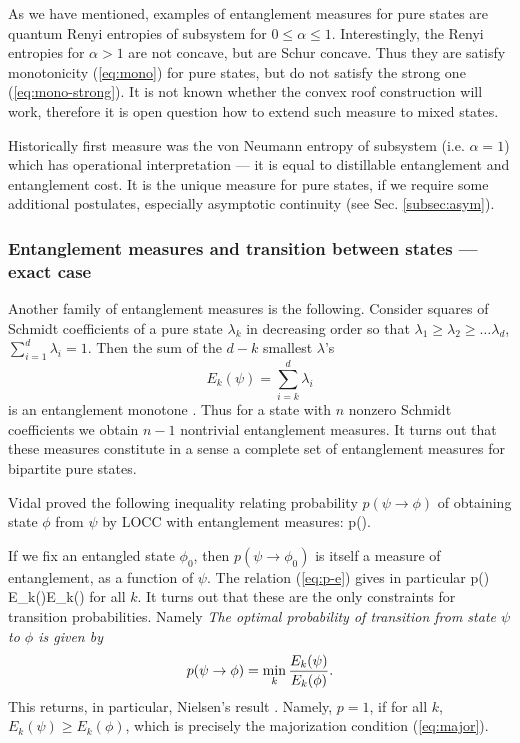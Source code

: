 \documentclass[rmp,12pt,preprint]{revtex4-2}
\begin{document}
As we have mentioned, examples of entanglement measures for pure
states are quantum Renyi entropies of subsystem for
$0\leq\alpha\leq1$. Interestingly, the Renyi entropies for
$\alpha>1$ are not concave, but are Schur concave. Thus they are
satisfy monotonicity (\ref{eq:mono}) for pure states, but do not
satisfy the strong one (\ref{eq:mono-strong}). It is not  known
whether the convex roof construction will work, therefore it is open question
 how to extend such measure to mixed states.



Historically first measure was the von Neumann entropy of subsystem
(i.e. $\alpha=1$) which has operational interpretation --- it is equal
to distillable entanglement and entanglement cost. It is the unique
measure for pure states, if we require some additional postulates,
especially asymptotic continuity (see Sec. \ref{subsec:asym}).



\subsubsection{Entanglement measures and transition between states --- exact case}
\label{subsubsec:em-tr-exact}
Another family of entanglement measures is the following. Consider
squares of Schmidt coefficients of a pure state $\lambda_k$ in
decreasing order so that $\lambda_1 \geq \lambda_2 \geq \ldots
\lambda_d$, $\sum_{i=1}^d\lambda_i=1$. Then the sum of the $d-k$
smallest $\lambda$'s \begin{equation} E_k(\psi)=\sum_{i=k}^d \lambda_i \end{equation} is an
entanglement monotone \cite{Vidal1999-ent-pure}. Thus for a state
with $n$ nonzero Schmidt coefficients we obtain $n-1$ nontrivial
entanglement measures. It turns out that these measures constitute
in a sense a complete set of entanglement measures for bipartite
pure states.

Vidal proved the following inequality relating probability $p(\psi\to \phi)$
of obtaining state $\phi$ from $\psi$ by LOCC with entanglement measures:
\be
p(\psi\to \phi).
\label{eq:p-e}
\ee

If we fix an entangled state $\phi_0$, then $p(\psi\to \phi_0)$ is
itself a measure of entanglement, as a function of $\psi$. The
relation (\ref{eq:p-e}) gives in particular \be p(\psi\to \phi) \leq
{E_k(\psi)\over E_k(\phi)} \ee for all $k$. It turns out that these
are the only constraints for transition probabilities. Namely
\cite{Vidal1999-ent-pure} {\it
The optimal probability of transition from state $\psi$ to $\phi$ is
given by \begin{equation} p(\psi\to \phi)=\min_k {E_k(\psi)\over E_k(\phi)}. \end{equation}
} This returns, in particular, Nielsen's result
\cite{Nielsen-pure-entanglement}. Namely, $p=1$, if for all $k$,
$E_k(\psi)\geq E_k(\phi)$, which is precisely the majorization
condition (\ref{eq:major}).
\end{document}

